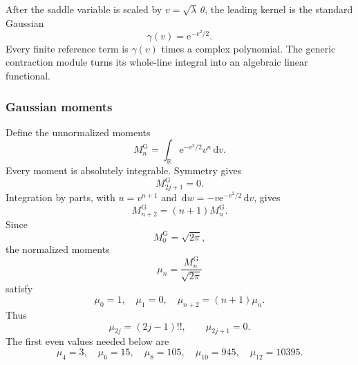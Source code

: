 \documentclass[11pt,oneside]{article}
\theoremstyle{definition}
\theoremstyle{remark}
\newcommand{\R}{\mathbb R}
\newcommand{\e}{\mathrm e}
\newcommand{\dd}{\,\mathrm d}
\begin{document}
After the saddle variable is scaled by $v=\sqrt{\lambda}\,\theta$, the leading kernel is the
standard Gaussian
\begin{equation}
 \gamma(v)=\e^{-v^2/2}.
 \label{integration:eq:standard-gaussian-kernel}
\end{equation}
Every finite reference term is $\gamma(v)$ times a complex polynomial.  The generic
contraction module turns its whole-line integral into an algebraic linear functional.

\subsubsection{Gaussian moments}

Define the unnormalized moments
\begin{equation}
 M_n^{\mathrm G}=\int_{\R}\e^{-v^2/2}v^n\dd v.
 \label{integration:eq:real-gaussian-moment}
\end{equation}
Every moment is absolutely integrable.  Symmetry gives
\begin{equation}
 M_{2j+1}^{\mathrm G}=0.
 \label{integration:eq:gaussian-odd-zero}
\end{equation}
Integration by parts, with $u=v^{n+1}$ and
$\dd w=-v\e^{-v^2/2}\dd v$, gives
\begin{equation}
 M_{n+2}^{\mathrm G}=(n+1)M_n^{\mathrm G}.
 \label{integration:eq:gaussian-moment-recurrence}
\end{equation}
Since
\begin{equation}
 M_0^{\mathrm G}=\sqrt{2\pi},
 \label{integration:eq:gaussian-moment-zero}
\end{equation}
the normalized moments
\begin{equation}
 \mu_n=\frac{M_n^{\mathrm G}}{\sqrt{2\pi}}
 \label{integration:eq:normalized-gaussian-moment}
\end{equation}
satisfy
\begin{equation}
 \mu_0=1,
 \quad
 \mu_1=0,
 \quad
 \mu_{n+2}=(n+1)\mu_n.
 \label{integration:eq:normalized-gaussian-recurrence}
\end{equation}
Thus
\begin{equation}
 \mu_{2j}=(2j-1)!!,
 \qquad
 \mu_{2j+1}=0.
 \label{integration:eq:normalized-gaussian-closed}
\end{equation}
The first even values needed below are
\begin{equation}
 \mu_4=3,
 \quad
 \mu_6=15,
 \quad
 \mu_8=105,
 \quad
 \mu_{10}=945,
 \quad
 \mu_{12}=10395.
 \label{integration:eq:gaussian-moments-second-correction}
\end{equation}
\end{document}
